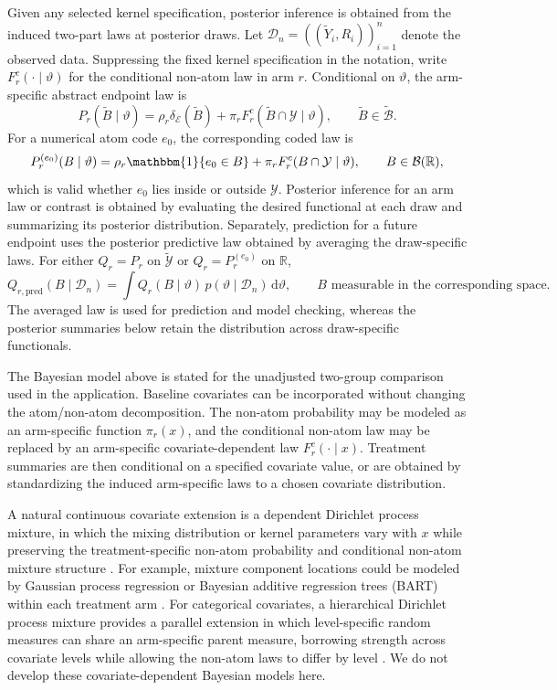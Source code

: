 \documentclass[11pt]{article}
\begin{document}
Given any selected kernel specification, posterior inference is obtained from the
induced two-part laws at posterior draws. Let
\(\mathcal{D}_n=((\widetilde{Y}_i,R_i))_{i=1}^n\) denote the
observed data. Suppressing the fixed kernel specification in the notation, write \(F_r^c(\cdot\mid\vartheta)\) for
the conditional non-atom law in arm \(r\). Conditional on \(\vartheta\), the
arm-specific abstract endpoint law is
\[
  P_r(\widetilde{B}\mid\vartheta)
  =
  \rho_r\delta_{\mathcal{E}}(\widetilde{B})
  +\pi_r F_r^c(\widetilde{B}\cap\mathcal{Y}\mid\vartheta),
  \qquad
  \widetilde{B}\in\widetilde{\mathcal{B}}.
\]
For a numerical atom code \(e_0\), the corresponding coded law is
\[
  P_r^{(e_0)}(B\mid\vartheta)
  =
  \rho_r\mathbbm{1}\{e_0\in B\}
  +\pi_r F_r^c(B\cap\mathcal{Y}\mid\vartheta),
  \qquad
  B\in\mathcal{B}(\mathbb{R}),
\]
which is valid whether \(e_0\) lies inside or outside \(\mathcal{Y}\). Posterior
inference for an arm law or contrast is obtained by evaluating the desired functional at each draw and summarizing its posterior distribution. Separately, prediction for a future endpoint uses the posterior predictive law obtained by averaging the draw-specific laws. For either \(Q_r=P_r\) on
\(\widetilde{\mathcal{Y}}\) or \(Q_r=P_r^{(e_0)}\) on \(\mathbb{R}\),
\[
  Q_{r,\mathrm{pred}}(B\mid\mathcal{D}_n)
  =
  \int Q_r(B\mid\vartheta)\,
  p(\vartheta\mid\mathcal{D}_n)\,\mathrm d\vartheta,
  \qquad
  B \text{ measurable in the corresponding space}.
\]
The averaged law is used for prediction and model checking, whereas the posterior summaries below retain the distribution across draw-specific functionals.


The Bayesian model above is stated for the unadjusted two-group comparison
used in the application. Baseline covariates can be incorporated without
changing the atom/non-atom decomposition. The non-atom probability may be modeled as
an arm-specific function \(\pi_r(x)\), and the conditional non-atom law may be
replaced by an arm-specific covariate-dependent law \(F_r^c(\cdot\mid x)\).
Treatment summaries are then conditional on a specified covariate value, or are
obtained by standardizing the induced arm-specific laws to a chosen covariate
distribution.

A natural continuous covariate extension is a dependent Dirichlet process
mixture, in which the mixing distribution or kernel parameters vary with \(x\)
while preserving the treatment-specific non-atom probability and conditional non-atom mixture
structure \citep{maceachern1999dependent,gelfand2005bayesian}. For example,
mixture component locations could be modeled by Gaussian process regression or Bayesian additive regression trees (BART) within each treatment arm
\citep{rasmussen2006gaussian,chipman2010bart}. For categorical covariates, a
hierarchical Dirichlet process mixture provides a parallel extension in which level-specific random measures can share an arm-specific parent measure,
borrowing strength across covariate levels while allowing the non-atom laws to
differ by level \citep{teh2006hierarchical,deiorio2004anova}. We do not develop
these covariate-dependent Bayesian models here.
\end{document}
